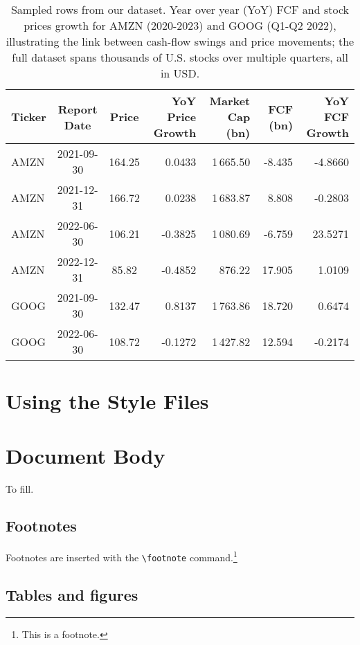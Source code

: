 \documentclass[11pt]{article}
\begin{document}
\begin{table*}[h]
  \setlength{\tabcolsep}{4pt}
  \centering
\caption{Sampled rows from our dataset. Year over year (YoY) FCF and stock prices growth for AMZN (2020-2023) and GOOG (Q1-Q2 2022), illustrating the link between cash-flow swings and price movements; the full dataset spans thousands of U.S. stocks over multiple quarters, all in USD.}
  \label{tab:sample-data}
  \begin{tabular}{lccrrrr}
    \toprule
    Ticker & Report Date & Price & YoY Price Growth & Market Cap (bn) & FCF (bn) & YoY FCF Growth \\
    \midrule
    AMZN & 2021-09-30 & 164.25 & 0.0433  & 1\,665.50 & -8.435 & -4.8660 \\
    AMZN & 2021-12-31 & 166.72 & 0.0238  & 1\,683.87 &  8.808 & -0.2803 \\
    AMZN & 2022-06-30 & 106.21 & -0.3825 & 1\,080.69 & -6.759 & 23.5271 \\
    AMZN & 2022-12-31 &  85.82 & -0.4852 &   876.22 & 17.905 &  1.0109 \\
    \midrule
    GOOG & 2021-09-30 & 132.47 & 0.8137  & 1\,763.86 & 18.720 &  0.6474 \\
    GOOG & 2022-06-30 & 108.72 & -0.1272 & 1\,427.82 & 12.594 & -0.2174 \\
    \bottomrule
  \end{tabular}
\end{table*}

\section{Using the Style Files}


\section{Document Body}

To fill.

\subsection{Footnotes}

Footnotes are inserted with the \verb|\footnote| command.\footnote{This is a footnote.}

\subsection{Tables and figures}
\end{document}
